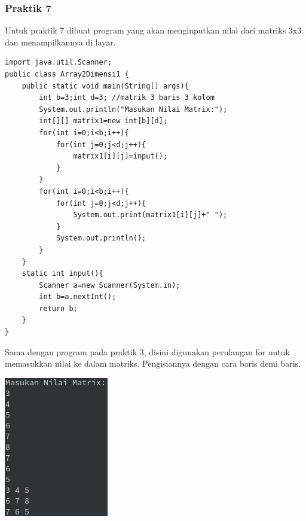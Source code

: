 \documentclass[a4paper,12pt]{article}
\begin{document}
\subsubsection{Praktik 7}
Untuk praktik 7 dibuat program yang akan menginputkan nilai dari matriks 3x3 dan menampilkannya di layar.
\begin{lstlisting}
import java.util.Scanner;
public class Array2Dimensi1 {
    public static void main(String[] args){
        int b=3;int d=3; //matrik 3 baris 3 kolom
        System.out.println("Masukan Nilai Matrix:");
        int[][] matrix1=new int[b][d];
        for(int i=0;i<b;i++){
            for(int j=0;j<d;j++){
                matrix1[i][j]=input();
            }
        }
        for(int i=0;i<b;i++){
            for(int j=0;j<d;j++){
                System.out.print(matrix1[i][j]+" ");
            }
            System.out.println();
        }
    }
    static int input(){
        Scanner a=new Scanner(System.in);
        int b=a.nextInt();
        return b;
    }
}
\end{lstlisting}
Sama dengan program pada praktik 3, disini digunakan perulangan for untuk memasukkan nilai ke dalam matriks. Pengisiannya dengan cara baris demi baris.
\begin{center}
    \includegraphics{7.png}
\end{center}
\end{document}
